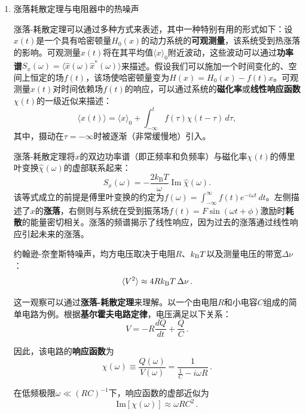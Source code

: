 \begin{enumerate}
\begin{enumerate}
		\item 涨落耗散定理与电阻器中的热噪声
		
		涨落-耗散定理可以通过多种方式来表述，其中一种特别有用的形式如下：设$x(t)$是一个具有哈密顿量$H_0(x)$的动力系统的\textbf{可观测量}，该系统受到热涨落的影响。可观测量$x(t)$将在其平均值$\langle x\rangle_0$附近波动，这些波动可以通过\textbf{功率谱}$S_x(\omega) = \langle \hat{x}(\omega)\hat{x}^*(\omega) \rangle$来描述。假设我们可以施加一个时间变化的、空间上恒定的场$f(t)$，该场使哈密顿量变为$H(x) = H_0(x) - f(t)x$。可观测量$x(t)$对时间依赖场$f(t)$的响应，可以通过系统的\textbf{磁化率}或\textbf{线性响应函数}$\chi(t)$的一级近似来描述：
		\begin{equation*}
			\langle x(t) \rangle = \langle x \rangle_0 + \int_{-\infty}^{t} f(\tau) \chi(t-\tau) \, d\tau,
		\end{equation*}
		其中，摄动在$\tau = -\infty$时被逐渐（非常缓慢地）引入。
		
		涨落-耗散定理将$x$的双边功率谱（即正频率和负频率）与磁化率$\chi(t)$的傅里叶变换$\hat{\chi}(\omega)$的虚部联系起来：
		\begin{equation*}
			S_x(\omega) = -\frac{2 k_\mathrm{B} T}{\omega} \operatorname{Im}\hat{\chi}(\omega).
		\end{equation*}
		该等式成立的前提是傅里叶变换的约定为$f(\omega) = \int_{-\infty}^{\infty} f(t) e^{-i\omega t} \, dt$。左侧描述了$x$的\textbf{涨落}，右侧则与系统在受到振荡场$f(t) = F \sin(\omega t + \phi)$激励时\textbf{耗散}的能量密切相关。涨落的频谱揭示了线性响应，因为过去的涨落通过线性响应引起未来的涨落。
		
		约翰逊-奈奎斯特噪声，均方电压取决于电阻$R$、$k_{\rm B}T$以及测量电压的带宽$\Delta\nu$：
		\begin{equation*}
			\langle V^2 \rangle \approx 4Rk_{\rm B}T\,\Delta\nu \, .
		\end{equation*}
		
		这一观察可以通过\textbf{涨落-耗散定理}来理解。以一个由电阻$R$和小电容$C$组成的简单电路为例。根据\textbf{基尔霍夫电路定律}，电压满足以下关系：
		\begin{equation*}
			V = -R\frac{dQ}{dt} + \frac{Q}{C} \, .
		\end{equation*}
		
		因此，该电路的\textbf{响应函数}为
		\begin{equation*}
			\chi(\omega) \equiv \frac{Q(\omega)}{V(\omega)} = \frac{1}{\frac{1}{C} - i\omega R} \, .
		\end{equation*}
		
		在低频极限$\omega \ll (RC)^{-1}$下，响应函数的虚部近似为
		\begin{equation*}
			\text{Im}\left[\chi(\omega)\right] \approx \omega RC^2 \, .
		\end{equation*}
		

\end{enumerate}
\end{enumerate}
